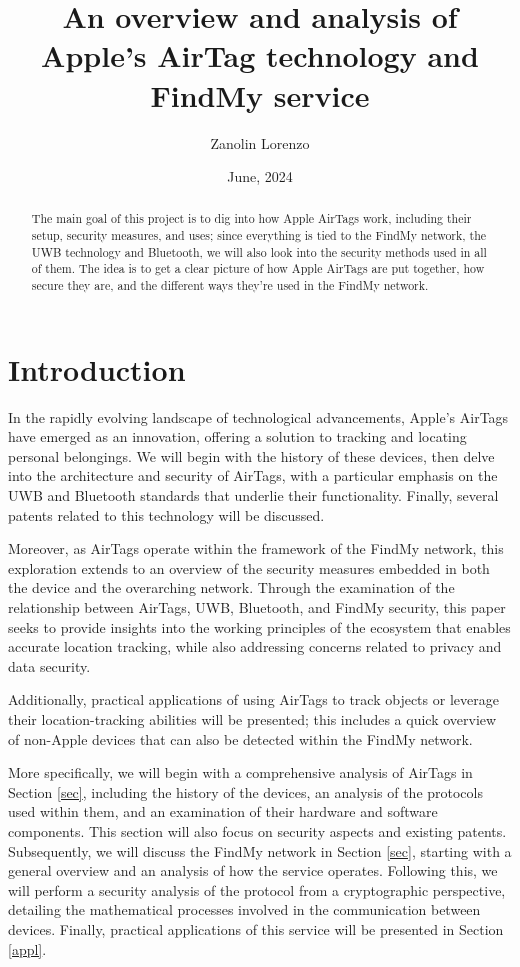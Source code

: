 \documentclass[english]{article}
\title{An overview and analysis of Apple’s AirTag technology and FindMy service}
\author{Zanolin Lorenzo}
\date{June, 2024}
\begin{document}
\maketitle

\tableofcontents
\newpage


\begin{abstract}
  The main goal of this project is to dig into how Apple AirTags work, including their setup, security measures, and uses; since everything is tied to the FindMy network, the UWB technology and Bluetooth, we will also look into the security methods used in all of them. The idea is to get a clear picture of how Apple AirTags are put together, how secure they are, and the different ways they're used in the FindMy network.
\end{abstract}

\section{Introduction}\label{sec:intro}

In the rapidly evolving landscape of technological advancements, Apple's AirTags have emerged as an innovation, offering a solution to tracking and locating personal belongings. We will begin with the history of these devices, then delve into the architecture and security of AirTags, with a particular emphasis on the UWB and Bluetooth standards that underlie their functionality. Finally, several patents related to this technology will be discussed.

Moreover, as AirTags operate within the framework of the FindMy network, this exploration extends to an overview of the security measures embedded in both the device and the overarching network. Through the examination of the relationship between AirTags, UWB, Bluetooth, and FindMy security, this paper seeks to provide insights into the working principles of the ecosystem that enables accurate location tracking, while also addressing concerns related to privacy and data security.

Additionally, practical applications of using AirTags to track objects or leverage their location-tracking abilities will be presented; this includes a quick overview of non-Apple devices that can also be detected within the FindMy network.

More specifically, we will begin with a comprehensive analysis of AirTags in Section \ref{sec}, including the history of the devices, an analysis of the protocols used within them, and an examination of their hardware and software components. This section will also focus on security aspects and existing patents. Subsequently, we will discuss the FindMy network in Section \ref{sec}, starting with a general overview and an analysis of how the service operates. Following this, we will perform a security analysis of the protocol from a cryptographic perspective, detailing the mathematical processes involved in the communication between devices. Finally, practical applications of this service will be presented in Section \ref{appl}.
\end{document}
